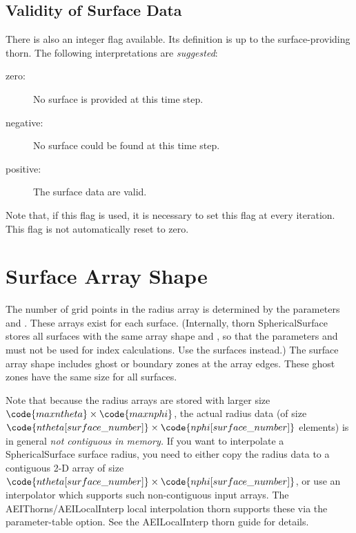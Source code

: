 \subsection{Validity of Surface Data}

There is also an integer flag  available.  Its
definition is up to the surface-providing thorn.  The following
interpretations are \emph{suggested}:
\begin{description}

\item[zero:] No surface is provided at this time step.

\item[negative:] No surface could be found at this time step.

\item[positive:] The surface data are valid.

\end{description}
Note that, if this flag is used, it is necessary to set this flag at
every iteration.  This flag is not automatically reset to zero.



\section{Surface Array Shape}

The number of grid points in the radius array  is
determined by the parameters  and .  These
arrays exist for each surface.  (Internally, thorn SphericalSurface
stores all surfaces with the same array shape  and
, so that the parameters   and
 must not be used for index calculations.  Use the
surfaces  instead.)  The surface array shape includes
ghost or boundary zones at the array edges.  These ghost zones have
the same size for all surfaces.

Note that because the radius arrays are stored with larger size
$\code{maxntheta} \times \code{maxnphi}$, the actual radius data
(of size
$\code{ntheta[surface\_number]} \times \code{nphi[surface\_number]}$
elements) is in general {\em not contiguous in memory.\/}
If you want to interpolate a SphericalSurface surface radius,
you need to either copy the radius data to a contiguous 2-D array of size
$\code{ntheta[surface\_number]} \times \code{nphi[surface\_number]}$,
or use an interpolator which supports such non-contiguous input arrays.
The AEIThorns/AEILocalInterp local interpolation thorn supports these
via the  parameter-table option.
See the AEILocalInterp thorn guide for details.



